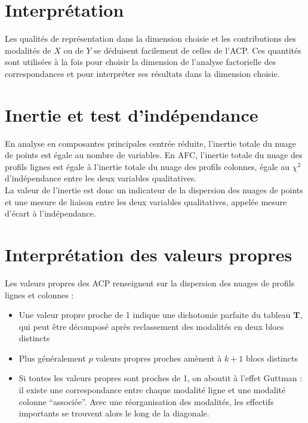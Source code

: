 \documentclass[letterpaper,10pt,english]{jupyterBook}
\begin{document}
\section{Interprétation}
\label{\detokenize{afc:interpretation}}
\sphinxAtStartPar
Les qualités de représentation dans la dimension choisie et les contributions
des modalités de \(X\) ou de \(Y\) se déduisent facilement de celles de l’ACP. Ces
quantités sont utilisées à la fois pour choisir la dimension de l’analyse factorielle des correspondances  et pour interpréter ses résultats dans la dimension choisie.


\section{Inertie et test d’indépendance}
\label{\detokenize{afc:inertie-et-test-d-independance}}
\sphinxAtStartPar
En analyse en composantes principales centrée réduite, l’inertie totale du nuage de points est  égale au nombre de variables. En AFC,  l’inertie totale du nuage des profils lignes est  égale à l’inertie totale du nuage des profils colonnes, égale au \(\chi^2\) d’indépendance entre les deux variables qualitatives.\\
La valeur de l’inertie est donc un indicateur de la dispersion des nuages de points et une mesure de liaison entre les deux variables qualitatives,  appelée mesure d’écart à l’indépendance.


\section{Interprétation des valeurs propres}
\label{\detokenize{afc:interpretation-des-valeurs-propres}}
\sphinxAtStartPar
Les valeurs propres des ACP renseignent sur la dispersion des nuages de profils lignes et colonnes :
\begin{itemize}
\item {} 
\sphinxAtStartPar
Une valeur propre proche de 1 indique une dichotomie parfaite du tableau \(\mathbf T\), qui peut être décomposé après reclassement des modalités en deux blocs distincts

\item {} 
\sphinxAtStartPar
Plus généralement \(p\) valeurs propres proches amènent à \(k+1\) blocs distincts

\item {} 
\sphinxAtStartPar
Si toutes les valeurs propres sont proches de 1, on aboutit à l’effet Guttman : il existe une correspondance entre chaque modalité ligne et une modalité colonne “associée”. Avec une réorganisation des modalités, les effectifs importants se trouvent alors le long de la diagonale.

\end{itemize}
\end{document}
